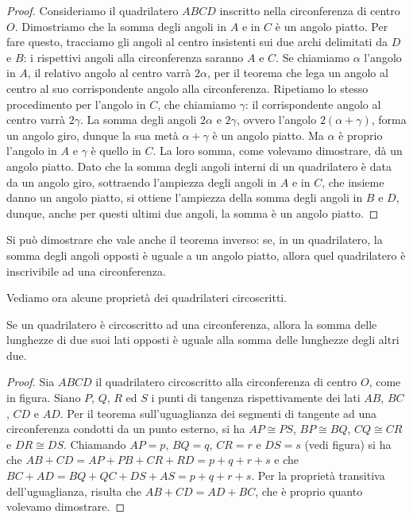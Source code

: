 \begin{proof}
Consideriamo il quadrilatero $ABCD$ inscritto nella circonferenza di 
centro $O$. Dimostriamo che la somma degli angoli in $A$ e in $C$ è 
un angolo piatto. Per fare questo, tracciamo gli angoli al centro 
insistenti sui due archi delimitati da $D$ e $B$: i rispettivi angoli 
alla circonferenza saranno $A$ e $C$. Se chiamiamo $\alpha$ l'angolo 
in $A$, il relativo angolo al centro varrà $ 2\alpha$, per il teorema 
che lega un angolo al centro al suo corrispondente angolo alla circonferenza. 
Ripetiamo lo stesso procedimento per l'angolo in $C$, che chiamiamo 
$\gamma$: il corrispondente angolo al centro varrà $2\gamma$. La 
somma degli angoli $2\alpha$ e $2\gamma$, ovvero l'angolo 
$2(\alpha+\gamma)$, forma un angolo giro, dunque la sua metà 
$\alpha+\gamma$ è un angolo piatto. Ma $\alpha$ è proprio l'angolo in 
$A$ e $\gamma$ è quello in $C$. La loro somma, come volevamo 
dimostrare, dà un angolo piatto. Dato che la somma degli angoli 
interni di un quadrilatero è data da un angolo giro, sottraendo 
l'ampiezza degli angoli in $A$ e in $C$, che insieme danno un angolo 
piatto, si ottiene l'ampiezza della somma degli angoli in $B$ e $D$, 
dunque, anche per questi ultimi due angoli, la somma è un angolo 
piatto.
\end{proof}

Si può dimostrare che vale anche il teorema inverso: se, in un 
quadrilatero, la somma degli angoli opposti è uguale a un angolo 
piatto, allora quel quadrilatero è inscrivibile ad una circonferenza.

Vediamo ora alcune proprietà dei quadrilateri circoscritti.

\begin{teorema}\label{teo:6.6}
Se un quadrilatero è circoscritto ad una circonferenza, allora la 
somma delle lunghezze di due suoi lati opposti è uguale alla somma 
delle lunghezze degli altri due.
\end{teorema}


\begin{inaccessibleblock}
 \begin{figure}[htb]
  \centering
\end{figure}
\end{inaccessibleblock}

\begin{proof}
Sia $ABCD$ il quadrilatero circoscritto alla circonferenza di centro 
$O$, come in figura. Siano $P$, $Q$, $R$ ed $S$ i punti di tangenza 
rispettivamente dei lati $AB$, $BC$, $CD$ e $AD$. Per il teorema 
sull'uguaglianza dei segmenti di tangente ad una circonferenza 
condotti da un punto esterno, si ha $AP\cong PS$, $BP\cong BQ$, 
$CQ\cong CR$ e $DR\cong DS$. Chiamando $AP=p$, $BQ=q$, $CR=r$ e 
$DS=s$ (vedi figura) si ha che $AB+CD = AP+PB+CR+RD = p+q+r+s$ e che 
$BC+AD = BQ+QC+DS+AS = p+q+r+s$.
Per la proprietà transitiva dell'uguaglianza, risulta che 
$AB+CD=AD+BC$, che è proprio quanto volevamo dimostrare.
\end{proof}


